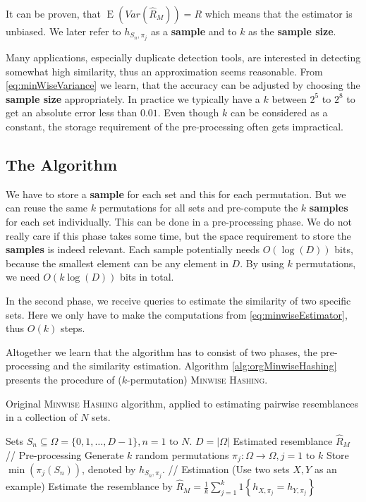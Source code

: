 \documentclass[a4paper]{article}
\DeclareMathOperator{\E}{E}
\begin{document}
It can be proven, that $\E(Var(\hat{R}_M)) = R$ which means that the estimator is unbiased.
We later refer to $h_{S_n,\pi_j}$ as a \textbf{sample} and to $k$ as the \textbf{sample size}.

Many applications, especially duplicate detection tools, are interested in detecting somewhat high similarity, thus an approximation seems reasonable. From \vref{eq:minWiseVariance} we learn, that the accuracy can be adjusted by choosing the \textbf{sample size} appropriately. In practice we typically have a $k$ between $2^5$ to $2^8$ to get an absolute error less than $0.01$. Even though $k$ can be considered as a constant, the storage requirement of the pre-processing often gets impractical.



\subsection{The Algorithm}

We have to store a \textbf{sample} for each set and this for each permutation. But we can reuse the same $k$ permutations for all sets and pre-compute the $k$ \textbf{samples} for each set individually. This can be done in a pre-processing phase. We do not really care if this phase takes some time, but the space requirement to store the \textbf{samples} is indeed relevant. Each sample potentially needs $O(\log(D))$ bits, because the smallest element can be any element in $D$. By using $k$ permutations, we need $O(k \log(D))$ bits in total.

In the second phase, we receive queries to estimate the similarity of two specific sets. Here we only have to make the computations from \vref{eq:minwiseEstimator}, thus $O(k)$ steps.

Altogether we learn that the algorithm has to consist of two phases, the pre-processing and the similarity estimation. Algorithm \vref{alg:orgMinwiseHashing} presents the procedure of ($k$-permutation) \textsc{Minwise Hashing}.

\begin{algorithm}[H]
\caption{Original \textsc{Minwise Hashing} algorithm, applied to estimating pairwise resemblances in a collection of $N$ sets.}
\label{alg:orgMinwiseHashing}
\begin{algorithmic}
\Require Sets $S_n \subseteq \Omega = \{0,1,\ldots,D-1\}, n = 1 \text{ to } N$. \Comment $D = \left| \Omega \right|$
\Ensure Estimated resemblance $\hat{R}_M$
\State // Pre-processing
\State Generate $k$ random permutations $\pi_j: \Omega\longrightarrow\Omega, j=1\text{ to }k$
	\State Store $\min(\pi_j(S_n))$, denoted by $h_{S_n,\pi_j}$.
\EndFor
\State
\State // Estimation (Use two sets $X,Y$ as an example)
\State Estimate the resemblance by $\hat{R}_M=\frac{1}{k}\sum_{j=1}^k 1 \left\lbrace h_{X,\pi_j}=h_{Y,\pi_j} \right\rbrace$
\end{algorithmic}
\end{algorithm}
\end{document}
